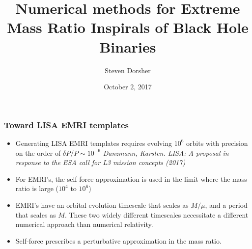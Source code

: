 \documentclass{beamer}
\title{Numerical methods for Extreme Mass Ratio Inspirals of Black Hole Binaries}
\author{Steven Dorsher}
\institute{Louisiana State University}
\date{October 2, 2017}
\begin{document}
\frame{\titlepage}









\begin{frame}
  \frametitle{Toward LISA EMRI templates}
  \begin{itemize}
  \item Generating LISA EMRI templates requires evolving $10^6$ orbits with precision on the order of $\delta P/P\sim 10^{-6}$ {\em Danzmann, Karsten. LISA: A proposal in response to the ESA call for L3 mission concepts (2017)}
  \item For EMRI's, the self-force approximation is used in the limit where the mass ratio is large ($10^4$ to $10^6$)
  \item EMRI's have an orbital evolution timescale that scales as $M/\mu$, and a period that scales as $M$. These two widely different timescales necessitate a different numerical approach than numerical relativity.
  \item Self-force prescribes a perturbative approximation in the mass ratio. 
  \end{itemize}
\end{frame}

\end{document}
